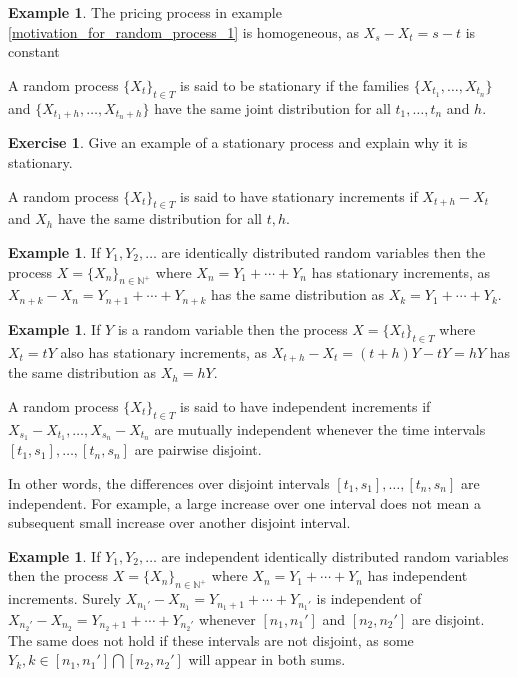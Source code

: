 \documentclass[12pt]{amsart}
\theoremstyle{definition}
\newtheorem{example}[theorem]{Example}
\newtheorem{exercise}[theorem]{Exercise}
\begin{document}
\begin{example} \label{motivation_for_random_process_2} The pricing process in example \ref{motivation_for_random_process_1} is homogeneous, as $X_s - X_t = s - t$ is constant
\end{example}

\dfn A random process $\{X_t\}_{t \in T}$ is said to be stationary if the families $\{X_{t_1}, \dots , X_{t_n}\}$ and $\{X_{t_1+h}, \dots , X_{t_n+h}\}$ have the same joint distribution for all $t_1, \dots , t_n$ and $h$.

\begin{exercise} Give an example of a stationary process and explain why it is stationary.
\end{exercise}

\dfn A random process $\{X_t\}_{t \in T}$ is said to have stationary increments if $X_{t+h} - X_t$ and $X_h$ have the same distribution for all $t, h$.

\begin{example} If $Y_1, Y_2, \dots$ are identically distributed random variables then the process $X = \{X_n\}_{n \in \mathbb{N}^+}$ where $X_n = Y_1 + \cdots + Y_n$ has stationary increments, as $X_{n+k} - X_n = Y_{n+1} + \cdots + Y_{n+k}$ has the same distribution as $X_k = Y_1 + \cdots + Y_k$.
\end{example}

\begin{example} If $Y$ is a random variable then the process $X = \{X_t\}_{t \in T}$ where $X_t = tY$ also has stationary increments, as $X_{t+h} - X_t = (t+h)Y - tY = hY$ has the same distribution as $X_h = hY$.
\end{example}

\dfn A random process $\{X_t\}_{t \in T}$ is said to have independent increments if $X_{s_1} - X_{t_1}, \dots , X_{s_n} - X_{t_n}$ are mutually independent whenever the time intervals $[t_1, s_1], \dots , [t_n, s_n]$ are pairwise disjoint.

In other words, the differences over disjoint intervals $[t_1, s_1], \dots ,[t_n, s_n]$ are independent. For example, a large increase over one interval does not mean a subsequent small increase over another disjoint interval.

\begin{example} If $Y_1, Y_2, \dots$ are independent identically distributed random variables then the process $X = \{X_n\}_{n \in \mathbb{N}^+}$ where $X_n = Y_1 + \cdots + Y_n$ has independent increments. Surely $X_{n_1'} - X_{n_1} = Y_{n_1 + 1} + \cdots + Y_{n_1'}$ is independent of $X_{n_2'} - X_{n_2} = Y_{n_2 + 1} + \cdots + Y_{n_2'}$ whenever $[n_1,n_1']$ and $[n_2,n_2']$ are disjoint. The same does not hold if these intervals are not disjoint, as some $Y_k, k \in [n_1, n_1'] \bigcap [n_2, n_2']$ will appear in both sums.
\end{example}
\end{document}
